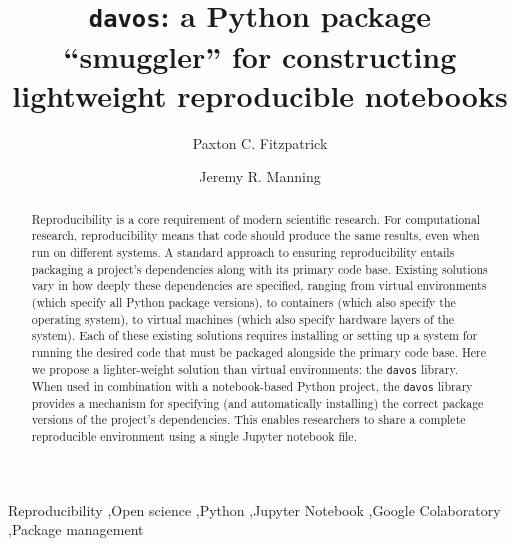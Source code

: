 \documentclass[preprint,12pt, a4paper]{elsarticle}
\begin{document}
\begin{frontmatter}

\title{\texttt{davos}: a Python package ``smuggler'' for constructing
  lightweight reproducible notebooks}
\author{Paxton C. Fitzpatrick}
\author{Jeremy R. Manning}
\address{Department of Psychological and Brain Sciences\\Dartmouth College, Hanover, NH 03755}


\begin{abstract}

  Reproducibility is a core requirement of modern scientific research.
  For computational research, reproducibility means that code should
  produce the same results, even when run on different systems.  A
  standard approach to ensuring reproducibility entails packaging a
  project's dependencies along with its primary code base.  Existing
  solutions vary in how deeply these dependencies are specified,
  ranging from virtual environments (which specify all Python package
  versions), to containers (which also specify the operating system),
  to virtual machines (which also specify hardware layers of the
  system).  Each of these existing solutions requires installing or
  setting up a system for running the desired code that must be
  packaged alongside the primary code base.  Here we propose a
  lighter-weight solution than virtual environments: the
  \texttt{davos} library.  When used in combination with a
  notebook-based Python project, the \texttt{davos} library provides a
  mechanism for specifying (and automatically installing) the correct
  package versions of the project's dependencies.  This enables researchers to
  share a complete reproducible environment using a single Jupyter
  notebook file.

\end{abstract}


\begin{keyword}
Reproducibility \sep Open science \sep Python \sep Jupyter Notebook \sep Google Colaboratory \sep Package management
\end{keyword}

\end{frontmatter}
\end{document}
